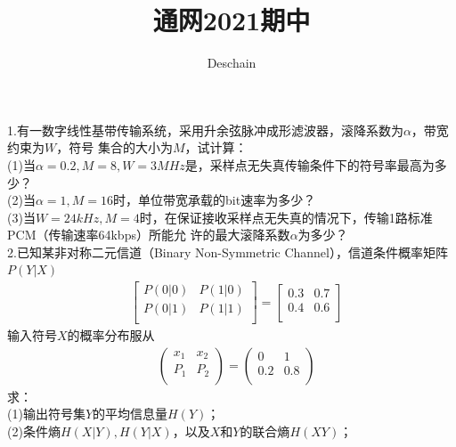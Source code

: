 \documentclass[UTF8]{ctexart}
\title{通网2021期中}
\author{Deschain}
\begin{document}
\maketitle
\section*{}
1.有一数字线性基带传输系统，采用升余弦脉冲成形滤波器，滚降系数为$\alpha$，带宽约束为$W$，符号
集合的大小为$M$，试计算：\\
(1)当$\alpha=0.2,M=8,W=3MHz$是，采样点无失真传输条件下的符号率最高为多少？\\
(2)当$\alpha=1,M=16$时，单位带宽承载的bit速率为多少？\\
(3)当$W=24kHz,M=4$时，在保证接收采样点无失真的情况下，传输1路标准PCM（传输速率64kbps）所能允
许的最大滚降系数$\alpha$为多少？\\
2.已知某非对称二元信道（Binary Non-Symmetric Channel），信道条件概率矩阵$P(Y\lvert X)$
\begin{equation*}
  \begin{aligned}
     & \begin{bmatrix}
      P(0\lvert0) & P(1\lvert0) \\
      P(0\lvert1) & P(1\lvert1) \\
    \end{bmatrix}=
    \begin{bmatrix}
      0.3 & 0.7 \\
      0.4 & 0.6 \\
    \end{bmatrix}
  \end{aligned}
\end{equation*}
输入符号$X$的概率分布服从
\begin{equation*}
  \begin{aligned}
     & \begin{pmatrix}
      x_1 & x_2 \\
      P_1 & P_2 \\
    \end{pmatrix}=
    \begin{pmatrix}
      0   & 1   \\
      0.2 & 0.8 \\
    \end{pmatrix}
  \end{aligned}
\end{equation*}
求：\\
(1)输出符号集$Y$的平均信息量$H(Y)$；\\
(2)条件熵$H(X\lvert Y),H(Y\lvert X)$，以及$X$和$Y$的联合熵$H(XY)$；\\
\end{document}
